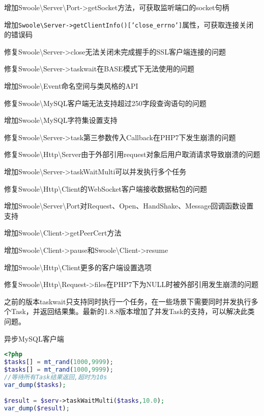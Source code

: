 \begin{compactitem}
\item 增加Swoole\textbackslash Server\textbackslash Port->getSocket方法，可获取监听端口的socket句柄
\item 增加\texttt{Swoole\textbackslash Server->getClientInfo()['close\_errno']}属性，可获取连接关闭的错误码
\item 修复Swoole\textbackslash Server->close无法关闭未完成握手的SSL客户端连接的问题
\item 修复Swoole\textbackslash Server->taskwait在BASE模式下无法使用的问题
\item 增加Swoole\textbackslash Event命名空间与类风格的API
\item 修复Swoole\textbackslash MySQL客户端无法支持超过250字段查询语句的问题
\item 增加Swoole\textbackslash MySQL字符集设置支持
\item 修复Swoole\textbackslash Server->task第三参数传入Callback在PHP7下发生崩溃的问题
\item 修复Swoole\textbackslash Http\textbackslash Server由于外部引用request对象后用户取消请求导致崩溃的问题
\item 增加Swoole\textbackslash Server->taskWaitMulti可以并发执行多个任务
\item 修复Swoole\textbackslash Http\textbackslash Client的WebSocket客户端接收数据粘包的问题
\item 增加Swoole\textbackslash Server\textbackslash Port对Request、Open、HandShake、Message回调函数设置支持
\item 增加Swoole\textbackslash Client->getPeerCert方法
\item 增加Swoole\textbackslash Client->pause和Swoole\textbackslash Client->resume
\item 增加Swoole\textbackslash Http\textbackslash Client更多的客户端设置选项
\item 修复Swoole\textbackslash Http\textbackslash Request->files在PHP7下为NULL时被外部引用发生崩溃的问题
\end{compactitem}



之前的版本taskwait只支持同时执行一个任务，在一些场景下需要同时并发执行多个Task，并返回结果集。最新的1.8.8版本增加了并发Task的支持，可以解决此类问题。


\begin{example}
异步MySQL客户端
\begin{lstlisting}[language=PHP]
<?php
$tasks[] = mt_rand(1000,9999);
$tasks[] = mt_rand(1000,9999);
//等待所有Task结果返回,超时为10s
var_dump($tasks);

$result = $serv->taskWaitMulti($tasks,10.0);
var_dump($result);
\end{lstlisting}
\end{example}


